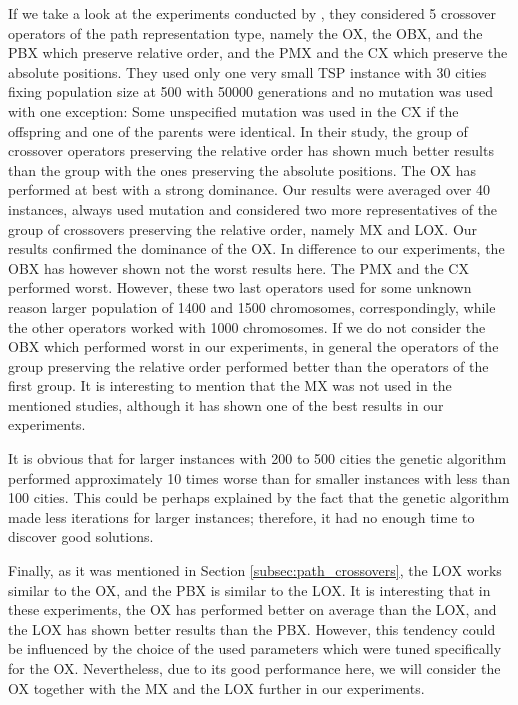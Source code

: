  If we take a look at the experiments conducted by \citeauthor{starkweather1991comparison} \cite{starkweather1991comparison}, they considered 5 crossover operators of the path representation type, namely the OX, the OBX, and the PBX which preserve relative order, and the PMX and the CX which preserve the absolute positions. They used only one very small TSP instance with 30 cities fixing population size at 500 with 50000 generations and no mutation was used with one exception: Some unspecified mutation was used in the CX if the offspring and one of the parents were identical. In their study, the group of crossover operators preserving the relative order has shown much better results than the group with the ones preserving the absolute positions. The OX has performed at best with a strong dominance. Our results were averaged over 40 instances, always used mutation and considered two more representatives of the group of crossovers preserving the relative order, namely MX and LOX. Our results confirmed the dominance of the OX. In difference to our experiments, the OBX has however shown not the worst results here. The PMX and the CX performed worst. However, these two last operators used for some unknown reason larger population of 1400 and 1500 chromosomes, correspondingly, while the other operators worked with 1000 chromosomes.  If we do not consider the OBX which performed worst in our experiments, in general the operators of the group preserving the relative order performed better than the operators of the first group. It is interesting to mention that the MX was not used in the mentioned studies, although it has shown one of the best results in our experiments.\par 

It is obvious that for larger instances with 200 to 500 cities the genetic algorithm performed approximately 10 times worse than for smaller instances with less than 100 cities. This could be perhaps explained by the fact that the genetic algorithm made less iterations for larger instances; therefore, it had no enough time to discover good solutions. \par 

Finally, as it was mentioned in Section \ref{subsec:path_crossovers}, the LOX works similar to the OX, and the PBX is similar to the LOX. It is interesting that in these experiments, the OX has performed better on average than the LOX, and the LOX has shown better results than the PBX. However, this tendency could be influenced by the choice of the used parameters which were tuned specifically for the OX. Nevertheless, due to its good performance here, we will consider the OX together with the MX and the LOX further in our experiments.\par 

